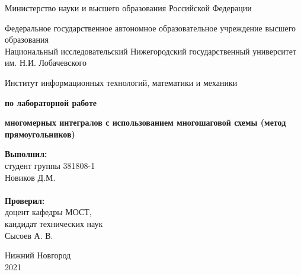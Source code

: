 \documentclass{report}
\begin{document}
\begin{titlepage}

\begin{center}
Министерство науки и высшего образования Российской Федерации
\end{center}

\begin{center}
Федеральное государственное автономное образовательное учреждение высшего образования \\
Национальный исследовательский Нижегородский государственный университет им. Н.И. Лобачевского
\end{center}

\begin{center}
Институт информационных технологий, математики и механики
\end{center}

\vspace{4em}

\begin{center}
\textbf{ по лабораторной работе} \\
\end{center}
\begin{center}
\textbf{ многомерных интегралов с использованием многошаговой схемы (метод прямоугольников)} \\
\end{center}

\vspace{4em}

\newbox{\lbox}
\newlength{\maxl}
\setlength{\maxl}{\wd\lbox}
\hfill\parbox{7cm}{
\hspace*{5cm}\hspace*{-5cm}\textbf{Выполнил:} \\ студент группы 381808-1 \\ Новиков Д.М.\\
\\
\hspace*{5cm}\hspace*{-5cm}\textbf{Проверил:}\\ доцент кафедры МОСТ, \\ кандидат технических наук \\ Сысоев А. В.
}

\vspace{\fill}

\begin{center} Нижний Новгород \\ 2021 \end{center}

\end{titlepage}
\end{document}
